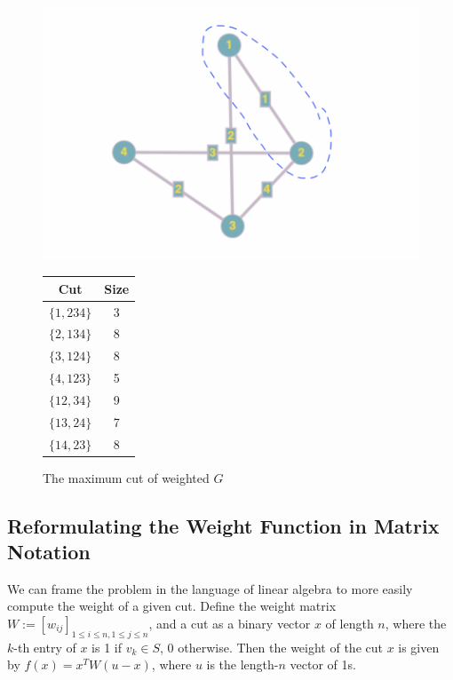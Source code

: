 \begin{figure}[!ht]
    \centering
    \includegraphics[scale=.35]{four_vertex_weighted_cut.png}
    \qquad
    \begin{tabular}[b]{|c|c|}
        \hline
        Cut & Size \\
        \hline
        $\{1,234\}$ & 3 \\
        $\{2,134\}$ & 8 \\
        $\{3,124\}$ & 8 \\
        $\{4,123\}$ & 5 \\
        $\{12,34\}$ & 9 \\
        $\{13,24\}$ & 7 \\
        $\{14,23\}$ & 8 \\
        \hline
    \end{tabular}
    \captionsetup{labelformat=andtable}
    \caption{The maximum cut of weighted $G$}
    \label{fig:four_vertex_weighted_cut}
\end{figure}

\newpage

\subsection{Reformulating the Weight Function in Matrix Notation}

\par We can frame the problem in the language of linear algebra to more easily compute the weight of a given cut. Define the weight matrix $W := [w_{ij}]_{1 \le i \le n, 1 \le j \le n}$, and a cut as a binary vector $x$ of length $n$, where the $k$-th entry of $x$ is 1 if $v_k\in S$, 0 otherwise. Then the weight of the cut $x$ is given by $f(x) = x^T W(u-x)$, where $u$ is the length-$n$ vector of 1s. \\

